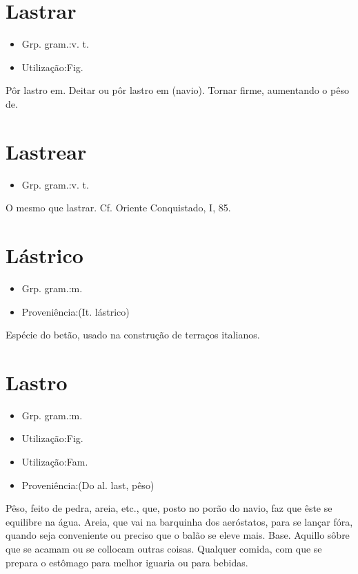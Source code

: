 \section{Lastrar}
\begin{itemize}
\item {Grp. gram.:v. t.}
\end{itemize}
\begin{itemize}
\item {Utilização:Fig.}
\end{itemize}
Pôr lastro em.
Deitar ou pôr lastro em (navio).
Tornar firme, aumentando o pêso de.
\section{Lastrear}
\begin{itemize}
\item {Grp. gram.:v. t.}
\end{itemize}
O mesmo que \textunderscore lastrar\textunderscore . Cf. \textunderscore Oriente Conquistado\textunderscore , I, 85.
\section{Lástrico}
\begin{itemize}
\item {Grp. gram.:m.}
\end{itemize}
\begin{itemize}
\item {Proveniência:(It. \textunderscore lástrico\textunderscore )}
\end{itemize}
Espécie do betão, usado na construção de terraços italianos.
\section{Lastro}
\begin{itemize}
\item {Grp. gram.:m.}
\end{itemize}
\begin{itemize}
\item {Utilização:Fig.}
\end{itemize}
\begin{itemize}
\item {Utilização:Fam.}
\end{itemize}
\begin{itemize}
\item {Proveniência:(Do al. \textunderscore last\textunderscore , pêso)}
\end{itemize}
Pêso, feito de pedra, areia, etc., que, posto no porão do navio, faz que êste se equilibre na água.
Areia, que vai na barquinha dos aeróstatos, para se lançar fóra, quando seja conveniente ou preciso que o balão se eleve mais.
Base.
Aquillo sôbre que se acamam ou se collocam outras coisas.
Qualquer comida, com que se prepara o estômago para melhor iguaria ou para bebidas.
